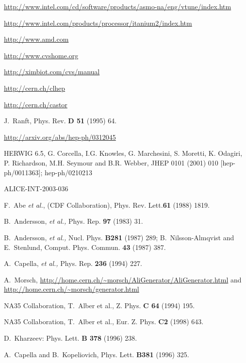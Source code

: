 \documentclass[12pt,a4paper,twoside]{article}
\begin{document}
{\begin{thebibliography}{99}
  \url{http://www.intel.com/cd/software/products/asmo-na/eng/vtune/index.htm}

  \url{http://www.intel.com/products/processor/itanium2/index.htm}

 \url{http://www.amd.com}

 \url{http://www.cvshome.org}

 \url{http://ximbiot.com/cvs/manual}

 \url{http://cern.ch/clhep}

 \url{http://cern.ch/castor}

 J.~Ranft, Phys. Rev. \textbf{D 51} (1995) 64.

\url{http://arxiv.org/abs/hep-ph/0312045}

 HERWIG 6.5, G. Corcella, I.G. Knowles, G. Marchesini, S. Moretti,
K. Odagiri, P. Richardson, M.H. Seymour and B.R. Webber, JHEP 0101
(2001) 010 [hep-ph/0011363]; hep-ph/0210213 

  ALICE-INT-2003-036

 F.~Abe {\it et al.}, (CDF Collaboration), Phys. Rev.
  Lett.\textbf{61} (1988) 1819.

 B.~Andersson, {\it et al.,} Phys. Rep. \textbf{97}
  (1983) 31.

 B.~Andersson, {\it et al.,} Nucl. Phys.
  \textbf{B281} (1987) 289; \newline B.~Nilsson-Almqvist and
  E.~Stenlund, Comput. Phys. Commun. \textbf{43} (1987) 387.

 A.~Capella, {\it et al.,} Phys. Rep. \textbf{236}
  (1994) 227.

 A.~Morsch,
  \url{http://home.cern.ch/~morsch/AliGenerator/AliGenerator.html} and
  \url{http://home.cern.ch/~morsch/generator.html}

 NA35 Collaboration, T.~Alber et al., \newblock Z.
  Phys. \textbf{C 64} (1994) 195.

 NA35 Collaboration, T.~Alber et al., \newblock
  Eur. Z. Phys. \textbf{C2} (1998) 643.

 D.~Kharzeev: \newblock Phys. Lett. \textbf{B
    378} (1996) 238.

 A.~Capella and B.~Kopeliovich, \newblock Phys.
  Lett. \textbf{B381} (1996) 325.


\end{thebibliography}}
\end{document}
